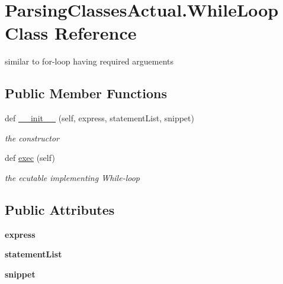 \hypertarget{class_parsing_classes_actual_1_1_while_loop}{}\section{Parsing\+Classes\+Actual.\+While\+Loop Class Reference}
\label{class_parsing_classes_actual_1_1_while_loop}


similar to for-\/loop having required arguements  


\subsection*{Public Member Functions}
\begin{DoxyCompactItemize}
\item 
def \hyperlink{class_parsing_classes_actual_1_1_while_loop_adf4ccccee2acf19cea376f4ebb9dfd66}{\+\_\+\+\_\+init\+\_\+\+\_\+} (self, express, statement\+List, snippet)
\begin{DoxyCompactList}\small\item\em the constructor \end{DoxyCompactList}\item 
\mbox{\label{class_parsing_classes_actual_1_1_while_loop_a458309ab7ca3701811c3561488ad2940}} 
def \hyperlink{class_parsing_classes_actual_1_1_while_loop_a458309ab7ca3701811c3561488ad2940}{exec} (self)
\begin{DoxyCompactList}\small\item\em the ecutable implementing While-\/loop \end{DoxyCompactList}\end{DoxyCompactItemize}
\subsection*{Public Attributes}
\begin{DoxyCompactItemize}
\item 
\mbox{\label{class_parsing_classes_actual_1_1_while_loop_a81fb2f8bd34b6e7a3e31a1afa5331cb5}} 
{\bfseries express}
\item 
\mbox{\label{class_parsing_classes_actual_1_1_while_loop_a0274f797bd8e0c3a3e260796acf14d6d}} 
{\bfseries statement\+List}
\item 
\mbox{\label{class_parsing_classes_actual_1_1_while_loop_a1c7300045f672d208fdee2f590bb5084}} 
{\bfseries snippet}
\end{DoxyCompactItemize}


